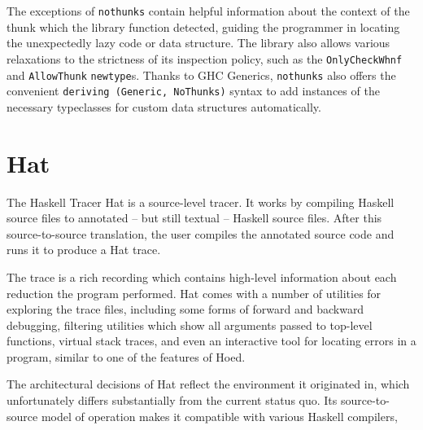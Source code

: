 \documentclass[thesis=B,english]{FITthesis}[2019/12/23]
\begin{document}
The exceptions of \texttt{nothunks} contain helpful information about the
context of the thunk which the library function detected, guiding the
programmer in locating the unexpectedly lazy code or data structure. The
library also allows various relaxations to the strictness of its inspection
policy, such as the \texttt{OnlyCheckWhnf} and \texttt{AllowThunk}
\texttt{newtype}s. Thanks to GHC Generics, %
\texttt{nothunks} also offers the convenient \texttt{deriving (Generic,
NoThunks)} syntax to add instances of the necessary typeclasses for custom data
structures automatically.


\section{Hat}
The Haskell Tracer Hat\cite{proj-hat} is a source-level tracer. It works by
compiling Haskell source files to annotated -- but still textual -- Haskell
source files. After this source-to-source translation, the user compiles the
annotated source code and runs it to produce a Hat trace.

The trace is a rich recording which contains high-level information about each
reduction the program performed. Hat comes with a number of utilities for
exploring the trace files, including some forms of forward and backward
debugging, filtering utilities which show all arguments passed to top-level
functions, virtual stack traces, and even an interactive tool for locating
errors in a program, similar to one of the features of Hoed.


The architectural decisions of Hat reflect the environment it originated in,
which unfortunately differs substantially from the current status quo. Its
source-to-source model of operation makes it compatible with various Haskell
compilers,
\end{document}
